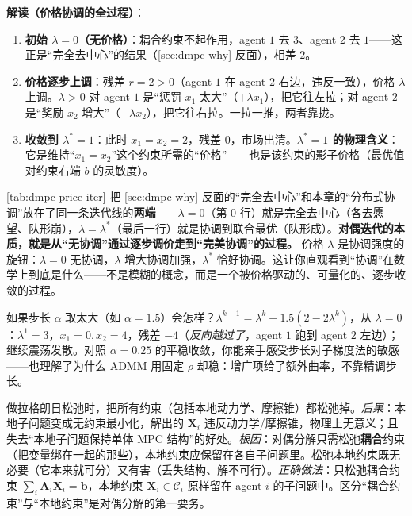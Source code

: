 \textbf{解读（价格协调的全过程）}：
\begin{enumerate}
  \item \textbf{初始 $\lambda=0$（无价格）}：耦合约束不起作用，agent $1$ 去 $3$、agent $2$ 去 $1$——这正是“完全去中心”的结果（\cref{sec:dmpc-why} 反面），相差 $2$。
  \item \textbf{价格逐步上调}：残差 $r=2>0$（agent $1$ 在 agent $2$ 右边，违反一致），价格 $\lambda$ 上调。$\lambda>0$ 对 agent $1$ 是“惩罚 $x_1$ 太大”（$+\lambda x_1$），把它往左拉；对 agent $2$ 是“奖励 $x_2$ 增大”（$-\lambda x_2$），把它往右拉。一拉一推，两者靠拢。
  \item \textbf{收敛到 $\lambda^*=1$}：此时 $x_1=x_2=2$，残差 $0$，市场出清。\textbf{$\lambda^*=1$ 的物理含义}：它是维持“$x_1=x_2$”这个约束所需的“价格”——也是该约束的影子价格（最优值对约束右端 $b$ 的灵敏度）。
\end{enumerate}

\begin{insight}\label{ins:dmpc-coordination-line}
\cref{tab:dmpc-price-iter} 把 \cref{sec:dmpc-why} 反面的“完全去中心”和本章的“分布式协调”放在了同一条迭代线的\textbf{两端}——$\lambda=0$（第 $0$ 行）就是完全去中心（各去愿望、队形崩），$\lambda=\lambda^*$（最后一行）就是协调到联合最优（队形成）。\textbf{对偶迭代的本质，就是从“无协调”通过逐步调价走到“完美协调”的过程。} 价格 $\lambda$ 是协调强度的旋钮：$\lambda=0$ 无协调，$\lambda$ 增大协调加强，$\lambda^*$ 恰好协调。这让你直观看到“协调”在数学上到底是什么——不是模糊的概念，而是一个被价格驱动的、可量化的、逐步收敛的过程。
\end{insight}

\begin{insight}\label{ins:dmpc-stepsize}
如果步长 $\alpha$ 取太大（如 $\alpha=1.5$）会怎样？$\lambda^{k+1}=\lambda^k+1.5(2-2\lambda^k)$，从 $\lambda=0$：$\lambda^1=3$，$x_1=0,x_2=4$，残差 $-4$（\emph{反向越过了}，agent $1$ 跑到 agent $2$ 左边）；继续震荡发散。对照 $\alpha=0.25$ 的平稳收敛，你能亲手感受步长对子梯度法的敏感——也理解了为什么 ADMM 用固定 $\rho$ 却稳：增广项给了额外曲率，不靠精调步长。
\end{insight}

\begin{pitfall}
做拉格朗日松弛时，把所有约束（包括本地动力学、摩擦锥）都松弛掉。\emph{后果}：本地子问题变成无约束最小化，解出的 $\mathbf{X}_i$ 违反动力学/摩擦锥，物理上无意义；且失去“本地子问题保持单体 MPC 结构”的好处。\emph{根因}：对偶分解只需松弛\textbf{耦合}约束（把变量绑在一起的那些），本地约束应保留在各自子问题里。松弛本地约束既无必要（它本来就可分）又有害（丢失结构、解不可行）。\emph{正确做法}：只松弛耦合约束 $\sum_i \mathbf{A}_i\mathbf{X}_i=\mathbf{b}$，本地约束 $\mathbf{X}_i\in\mathcal{C}_i$ 原样留在 agent $i$ 的子问题中。区分“耦合约束”与“本地约束”是对偶分解的第一要务。
\end{pitfall}

